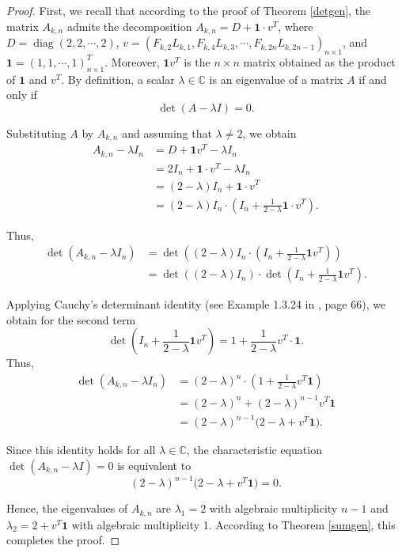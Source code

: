 \documentclass[11pt]{birkjour}
\theoremstyle{definition}
\theoremstyle{remark}
\numberwithin{equation}{section}
\begin{document}
\begin{proof}
First, we recall that according to the proof of Theorem \ref{detgen}, the matrix $A_{k,n}$ admits the decomposition
$A_{k,n}=D+\mathbf{1}\cdot v^{T}$, where
$D=\operatorname{diag}(2,2,\cdots,2)$,
$v=\left(F_{k,2}L_{k,1},F_{k,4}L_{k,3},\cdots, F_{k,2n}L_{k,2n-1} \right)_{n\times 1}$,
and $\mathbf{1}=(1,1,\cdots,1)_{n\times 1}^{T}$.
Moreover, $\mathbf{1}v^{T}$ is the $n\times n$ matrix obtained as the product of $\mathbf{1}$ and $v^{T}$.
By definition, a scalar $\lambda \in \mathbb{C}$ is an eigenvalue of a matrix $A$ if and only if
\[
\det(A - \lambda I) = 0.
\]

\noindent Substituting $A$ by $A_{k,n}$ and assuming that $\lambda \neq 2$, we obtain
\begin{align*}
    A_{k,n}-\lambda I_{n}&= D+\mathbf{1}v^{T}-\lambda I_{n}\\ 
    &=2I_{n}+\mathbf{1}\cdot v^{T}-\lambda I_{n}\\
    &=(2-\lambda)I_{n}+\mathbf{1}\cdot v^{T}\\
    &=(2-\lambda)I_{n} \cdot\left( I_{n}+\frac{1}{2-\lambda}\mathbf{1}\cdot v^{T}\right).
\end{align*}

\noindent Thus,
\begin{align*}
\det(A_{k,n}-\lambda I_{n})&=\det\left((2-\lambda)I_{n}\cdot \left(I_{n}+\frac{1}{2-\lambda}\mathbf{1}v^{T}\right)\right)\\
&=\det\left((2-\lambda)I_n\right)\cdot\det\left(I_{n}+\frac{1}{2-\lambda}\mathbf{1}v^{T}\right).
\end{align*}

\noindent Applying Cauchy’s determinant identity (see Example 1.3.24 in \cite{HornJohnson}, page 66), we obtain for the second term
\[
\det\left(I_{n}+\frac{1}{2-\lambda}\mathbf{1}v^{T}\right)
=
1+\frac{1}{2-\lambda}v^{T}\cdot\mathbf{1}.
\]
Thus,
\begin{align*}
\det(A_{k,n}-\lambda I_{n})&=(2-\lambda)^{n}\cdot\left(1+\frac{1}{2-\lambda}v^{T}\mathbf{1}\right)\\
&=(2-\lambda)^{n}+(2-\lambda)^{n-1}v^{T}\mathbf{1}\\
&=(2-\lambda)^{n-1}\bigl(2-\lambda+v^{T}\mathbf{1}\bigr).
\end{align*}

\noindent Since this identity holds for all $\lambda \in \mathbb{C}$, the characteristic equation
$\det(A_{k,n} - \lambda I) = 0$ is equivalent to
\[
(2-\lambda)^{n-1}\bigl(2-\lambda + v^{T}\mathbf{1}\bigr) = 0.
\]

\noindent Hence, the eigenvalues of $A_{k,n}$ are $\lambda_{1} = 2$ with algebraic multiplicity $n-1$
and $\lambda_{2} = 2 + v^{T}\mathbf{1}$ with algebraic multiplicity 1.
According to Theorem \ref{sumgen}, this completes the proof.
\end{proof}
\end{document}
